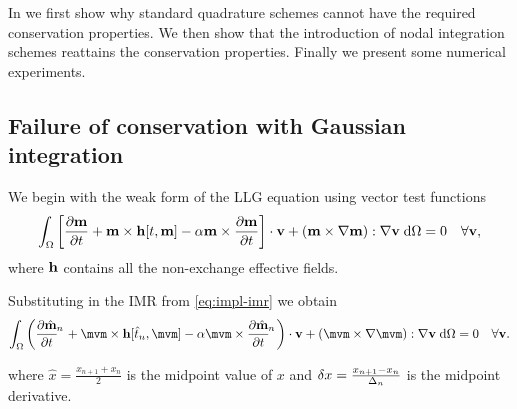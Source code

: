 In  we first show why standard quadrature schemes cannot have the required conservation properties.
We then show that the introduction of nodal integration schemes reattains the conservation properties.
Finally we present some numerical experiments.


\subsection{Failure of conservation with Gaussian integration}

\newcommand{\midpoint}[1]{\hat{#1}}
\newsubcommand{\mvm}{\midpoint{\mv}}{n}
\newcommand{\tm}{\midpoint{t}_n}
\newcommand{\dtop}{\delta}
\newcommand{\pdsub}[3]{\mathrlap{\pd{#1\mathrlap{_{#2}}}{#3}}\phantom{\pd{#1_{#2}}{#3}}}
\newcommand{\dmdtm}{\pdsub{\midpoint{\mv}}{n}{t}}
\newcommand{\dmdtml}{\pdsub{\midpoint{\mv}}{n,l}{t}}
\newcommand{\dmdtmj}{\pdsub{\midpoint{\mv}}{n,j}{t}}

\newcommand{\ipg}[2]{\intd{{#1} \cdot {#2}}}

We begin with the weak form of the LLG equation using vector test functions
\begin{equation}
  \label{eq:weak-llg}
  {\int_{\Omega} { {\left[ \frac{\partial \mathbf{m}}{\partial t}+ \mathbf{m}\times \mathbf{h}[t, \mathbf{m}] - \alpha\mathbf{m}\times \frac{\partial \mathbf{m}}{\partial t}\right]} \cdot \mathbf{v}+ {\left( \mathbf{m}\times \nabla\mathbf{m}\right)} : \nabla\mathbf{v}} {\; \mathrm{{d}}}{\Omega}} = 0 \quad \forall \mathbf{v},
\end{equation}
where $\mathbf{h}$ contains all the non-exchange effective fields.


Substituting in the IMR from \cref{eq:impl-imr} we obtain
\begin{equation}
  \label{eq:weak-llg-imr}
  \intd{\bigb{\dmdtm + \mvm \times \hv[\tm, \mvm] - \dampc \mvm \times \dmdtm} \cdot \testv
  + \bigb{\mvm \times \grad \mvm} : \grad \testv} = 0 \quad \forall \testv.
\end{equation}

where $\midpoint{x} = \frac{x_{n+1} + x_{n}}{2}$ is the midpoint value of $x$ and $\dtop x = \frac{x_{n+1} - x_n}{\dtn}$ is the midpoint derivative.


